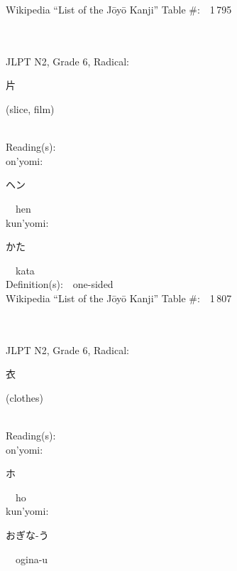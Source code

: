 \begin{multicols}{2}
Wikipedia ``List of the J\=oy\=o Kanji'' Table \#:\ \ 1\,795 \\
\ \ \\
{\fontsize{34pt}{40pt}  }\ \ \\  %
{JLPT N2, Grade 6, Radical:\ \ {\begin{CJK}{UTF8}{min} 片 \end{CJK}} (slice, film) } \\
Reading(s):\ \ \\
{\hspace*{1em}}on'yomi:\ \ \\
{\hspace*{2em}}{\begin{CJK}{UTF8}{min} ヘン \end{CJK}}\ \ hen\ \ \\
{\hspace*{1em}}kun'yomi:\ \ \\
{\hspace*{2em}}{\begin{CJK}{UTF8}{min} かた \end{CJK}}\ \ kata\ \ \\
Definition(s):\ \ one-sided \\
Wikipedia ``List of the J\=oy\=o Kanji'' Table \#:\ \ 1\,807 \\
\ \ \\
{\fontsize{34pt}{40pt}  }\ \ \\  %
{JLPT N2, Grade 6, Radical:\ \ {\begin{CJK}{UTF8}{min} 衣 \end{CJK}} (clothes) } \\
Reading(s):\ \ \\
{\hspace*{1em}}on'yomi:\ \ \\
{\hspace*{2em}}{\begin{CJK}{UTF8}{min} ホ \end{CJK}}\ \ ho\ \ \\
{\hspace*{1em}}kun'yomi:\ \ \\
{\hspace*{2em}}{\begin{CJK}{UTF8}{min} おぎな-う \end{CJK}}\ \ ogina-u\ \ \\

\end{multicols}
